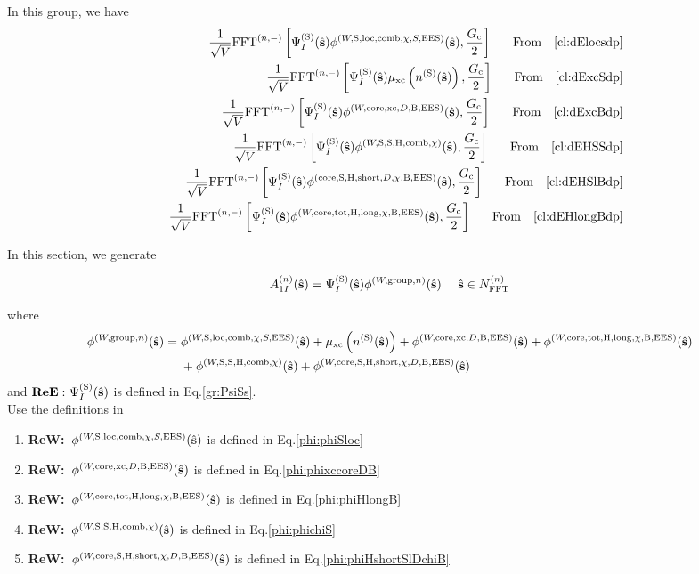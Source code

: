 \documentclass[paper=a4, fontsize=11pt]{article} %
\numberwithin{equation}{section} %
\numberwithin{figure}{section} %
\numberwithin{table}{section} %
\newcommand{\bs}{{\bf{s}}}
\newcommand{\hs}{{\hat{\bf{s}}}}
\newcommand{\rS}{{\mathrm{S}}}
\newcommand{\rEES}{{\mathrm{EES}}}
\newcommand{\rxc}{{\mathrm{xc}}}
\newcommand{\rgr}{{\mathrm{group}}}
\newcommand{\rcore}{{\mathrm{core}}}
\newcommand{\rshort}{{\mathrm{short}}}
\newcommand{\rlong}{{\mathrm{long}}}
\newcommand{\rH}{{\mathrm{H}}}
\newcommand{\rB}{{\mathrm{B}}}
\newcommand{\rcomb}{{\mathrm{comb}}}
\newcommand{\rlo}{{\mathrm{loc}}}
\newcommand{\rtot}{{\mathrm{tot}}}
\newcommand{\NFFTn}{{N^{(n)}_{\mathrm{FFT}}}}
\newcommand{\hGc}{{\frac{G_{\mathrm{c}}}{2}}}
\newcommand{\FFTni}{{\mathrm{FFT}^{(n,-)}}}
\newcommand{\hsinn}{{\ \ \ \ \hs \in \NFFTn}}
\newcommand{\fr}{{\nonumber \ \ \ \ \ \mathrm{From}\ \ \ }}
\newcommand{\ReE}{{{\bf ReE:\ }}}
\newcommand{\ReW}{{{\bf ReW:\ }}}
\begin{document}
In this group, we have
\begin{eqnarray}
&& \frac{1}{\sqrt V} \FFTni \left[\Psi_{I}^{(\rS)}(\hat \bs) \phi^{(W,\rS,\rlo,\rcomb,\chi,S,\rEES)}(\hs),\hGc \right] \fr \eqref{cl:dElocsdp}\\
&& \frac{1}{\sqrt V} \FFTni \left[ \Psi_{I}^{(\rS)}(\hat \bs)\mu_{\rxc}\left(n^{(\rS)}(\hat \bs)\right),\hGc \right] \fr \eqref{cl:dExcSdp}\\
&& \frac{1}{\sqrt V} \FFTni \left[\Psi_{I}^{(\rS)}(\hat \bs) \phi^{(W,\rcore,\rxc,D,\rB,\rEES)}(\hs),\hGc \right] \fr \eqref{cl:dExcBdp}\\
&& \frac{1}{\sqrt V} \FFTni \left[ \Psi_{I}^{(\rS)} (\hat \bs) \phi^{(W,\rS,\rS,\rH,\rcomb,\chi)}(\hs),\hGc \right] \fr \eqref{cl:dEHSSdp}\\
&& \frac{1}{\sqrt V} \FFTni \left[\Psi_{I}^{(\rS)}(\hat \bs)\phi^{(\rcore,\rS,\rH,\rshort,D,\chi,\rB,\rEES)}(\hs),\hGc\right] \fr \eqref{cl:dEHSlBdp}\\
&&\frac{1}{\sqrt V} \FFTni \left[\Psi_{I}^{(\rS)}(\hat \bs) \phi^{(W,\rcore,\rtot,\rH,\rlong,\chi,\rB,\rEES)}(\hs),\hGc\right] \fr \eqref{cl:dEHlongBdp}
\end{eqnarray}

In this section, we generate 

\begin{equation}
\begin{split}\label{gr:A1ns}
A_{1I}^{(n)}(\hs) &= \Psi_{I}^{(\rS)}(\hat \bs) \phi^{(W,\rgr,n)}(\hat \bs) \hsinn \\ 
\end{split}
\end{equation}

where
\begin{equation}
\begin{split}
\phi^{(W,\rgr,n)}(\hs) &= \phi^{(W,\rS,\rlo,\rcomb,\chi,S,\rEES)}(\hs)+ \mu_{\rxc}\left(n^{(\rS)}(\hat \bs)\right) + \phi^{(W,\rcore,\rxc,D,\rB,\rEES)}(\hs) + \phi^{(W,\rcore,\rtot,\rH,\rlong,\chi,\rB,\rEES)}(\hs)  \\
&\ \ \ \ + \phi^{(W,\rS,\rS,\rH,\rcomb,\chi)}(\hs) + \phi^{(W,\rcore,\rS,\rH,\rshort,\chi,D,\rB,\rEES)}(\hs) \\
\end{split}
\end{equation}
and $\ReE \Psi_{I}^{(\rS)}(\hat \bs)$ is defined in Eq.\eqref{gr:PsiSs}.\\

Use the definitions in
\begin{enumerate}
\item \ReW $\phi^{(W,\rS,\rlo,\rcomb,\chi,S,\rEES)}(\hs)$ is defined in Eq.\eqref{phi:phiSloc}
\item \ReW $\phi^{(W,\rcore,\rxc,D,\rB,\rEES)}(\hs)$ is defined in Eq.\eqref{phi:phixccoreDB}
\item \ReW $\phi^{(W,\rcore,\rtot,\rH,\rlong,\chi,\rB,\rEES)}(\hs) $ is defined in Eq.\eqref{phi:phiHlongB}
\item \ReW $\phi^{(W,\rS,\rS,\rH,\rcomb,\chi)}(\hs)$ is defined in Eq.\eqref{phi:phichiS}
\item \ReW $\phi^{(W,\rcore,\rS,\rH,\rshort,\chi,D,\rB,\rEES)}(\hs)$ is defined in Eq.\eqref{phi:phiHshortSlDchiB}
\end{enumerate}
\end{document}
